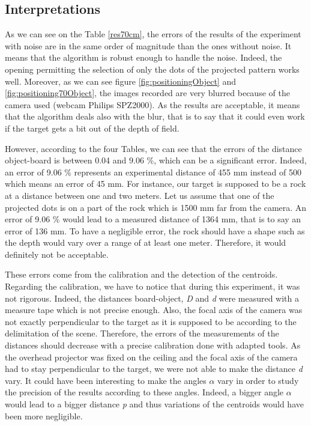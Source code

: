 \subsection{Interpretations}
As we can see on the Table \ref{res70cm}, the errors of the results of the experiment with noise are in the same order of magnitude than the ones without noise. It means that the algorithm is robust enough to handle the noise. Indeed, the 
opening permitting the selection of only the dots of the projected pattern works well. Moreover, as we can see figure \ref{fig:positioningObject} and \ref{fig:positioning70Object}, the images recorded are very blurred because of the camera used (webcam Philips SPZ2000). As the results are acceptable, it means that the algorithm deals also with the blur, that is to say that it could even work if the target gets a bit out of the depth of field.

However, according to the four Tables, we can see that the errors of the distance object-board is between 0.04 and 9.06 \%, which can be a significant error. Indeed, an error of 9.06 \% represents an experimental distance of 455 mm instead of 500 which means an error of 45 mm. For instance, our target is supposed to be a rock at a distance between one and two meters. Let us assume that one of the projected dots is on a part of the rock which is 1500 mm far from the camera. An error of 9.06 \% would lead to a measured distance of 1364 mm, that is to say an error of 136 mm. To have a negligible error, the rock should have a shape such as the depth would vary over a range of at least one meter. Therefore, it would definitely not be acceptable.

These errors come from the calibration and the detection of the centroids. Regarding the calibration, we have to notice that during this experiment, it was not rigorous. Indeed, the distances board-object, \emph{D} and \emph{d} were measured with a measure tape which is not precise enough. Also, the focal axis of the camera was not exactly perpendicular to the target as it is supposed to be according to the delimitation of the scene. Therefore, the errors of the measurements of the distances should decrease with a precise calibration done with adapted tools. As the overhead projector was fixed on the ceiling and the focal axis of the camera had to stay perpendicular to the target, we were not able to make the distance \emph{d} vary. It could have been interesting to make the angles $\alpha$ vary in order to study the precision of the results according to these angles. Indeed, a bigger angle $\alpha$ would lead to a bigger distance \emph{p} and thus variations of the centroids would have been more negligible.

